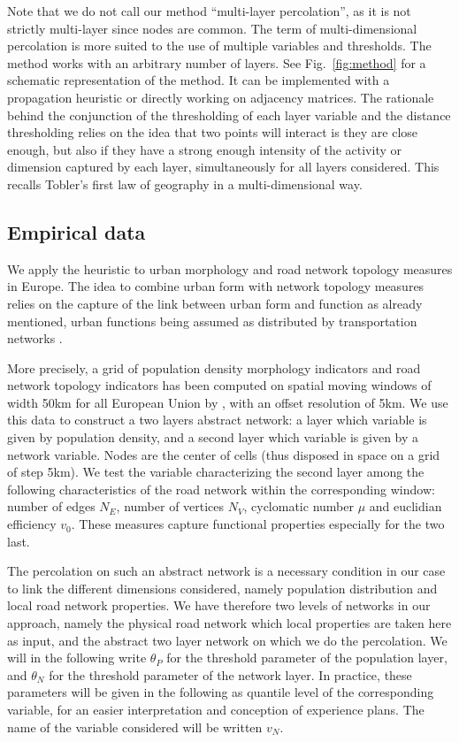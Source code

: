 \documentclass{article}
\begin{document}
Note that we do not call our method ``multi-layer percolation'', as it is not strictly multi-layer since nodes are common. The term of multi-dimensional percolation is more suited to the use of multiple variables and thresholds. The method works with an arbitrary number of layers. See Fig.~\ref{fig:method} for a schematic representation of the method. It can be implemented with a propagation heuristic or directly working on adjacency matrices. The rationale behind the conjunction of the thresholding of each layer variable and the distance thresholding relies on the idea that two points will interact is they are close enough, but also if they have a strong enough intensity of the activity or dimension captured by each layer, simultaneously for all layers considered. This recalls Tobler's first law of geography \citep{tobler2004first} in a multi-dimensional way.



\subsection{Empirical data}


We apply the heuristic to urban morphology and road network topology measures in Europe. The idea to combine urban form with network topology measures relies on the capture of the link between urban form and function as already mentioned, urban functions being assumed as distributed by transportation networks \citep{raimbault2018caracterisation}.

More precisely, a grid of population density morphology indicators and road network topology indicators has been computed on spatial moving windows of width 50km for all European Union by \cite{raimbault2018urban}, with an offset resolution of 5km. We use this data to construct a two layers abstract network: a layer which variable is given by population density, and a second layer which variable is given by a network variable. Nodes are the center of cells (thus disposed in space on a grid of step 5km). We test the variable characterizing the second layer among the following characteristics of the road network within the corresponding window: number of edges $N_E$, number of vertices $N_V$, cyclomatic number $\mu$ and euclidian efficiency $v_0$. These measures capture functional properties especially for the two last.

The percolation on such an abstract network is a necessary condition in our case to link the different dimensions considered, namely population distribution and local road network properties. We have therefore two levels of networks in our approach, namely the physical road network which local properties are taken here as input, and the abstract two layer network on which we do the percolation. We will in the following write $\theta_P$ for the threshold parameter of the population layer, and $\theta_N$ for the threshold parameter of the network layer. In practice, these parameters will be given in the following as quantile level of the corresponding variable, for an easier interpretation and conception of experience plans. The name of the variable considered will be written $v_N$.
\end{document}
